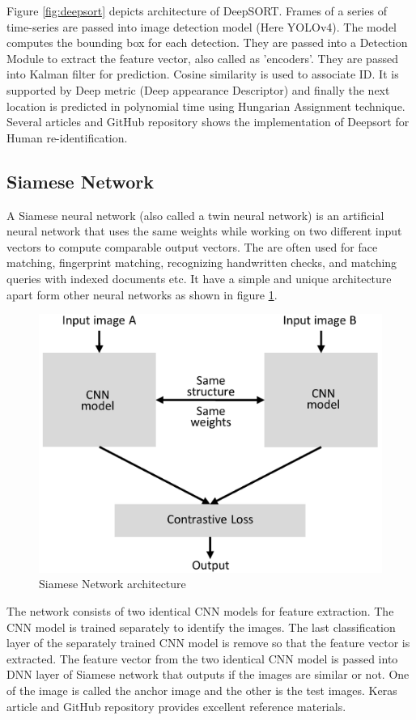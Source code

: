 Figure \ref{fig:deepsort} depicts architecture of DeepSORT. Frames of a series of time-series are passed into image detection model (Here YOLOv4). The model computes the bounding box for each detection. They are passed into a Detection Module to extract the feature vector, also called as 'encoders'. They are passed into Kalman filter for prediction. Cosine similarity is used to associate ID. It is supported by Deep metric (Deep appearance Descriptor) and finally the next location is predicted in polynomial time using Hungarian Assignment technique. Several articles \cite{deepsort_web}  \cite{theaiguyscode_deepsort} and GitHub repository \cite{obj_track_deep_yolo} shows the implementation of Deepsort for Human re-identification.


\subsection{Siamese Network}
A Siamese neural network (also called a twin neural network) is an artificial neural network that uses the same weights while working on two different input vectors to compute comparable output vectors. The are often used for face matching, fingerprint matching, recognizing handwritten checks, and matching queries with indexed documents etc. It have a simple and unique architecture apart form other neural networks as shown in figure \ref{fig:siamese}.

\begin{figure}[h!]
	\centering
	\includegraphics[width=0.5\linewidth]{Images/siamese}
	\caption{Siamese Network architecture}
	\label{fig:siamese}
\end{figure}
 
The network consists of two identical CNN models for feature extraction. The CNN model is trained separately to identify the images. The last classification layer of the separately trained CNN model is remove so that the feature vector is extracted. The feature vector from the two identical CNN model is passed into DNN layer of Siamese network that outputs if the images are similar or not. One of the image is called the anchor image and the other is the test images. Keras article \cite{siamese_keras} and GitHub repository \cite{siamese_git} provides excellent reference materials.


